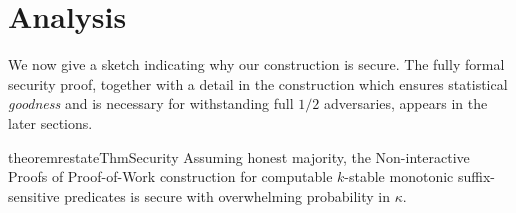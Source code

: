 \section{Analysis}
\label{sec:security}

We now give a sketch indicating why our construction is secure. The fully formal
security proof, together with a detail in the construction which ensures
statistical \emph{goodness} and is necessary for withstanding full $1/2$
adversaries, appears in the later sections.

\begin{restatable}[Security]{theorem}{restateThmSecurity}
    \label{thm.security}
    Assuming honest majority, the Non-interactive Proofs of Proof-of-Work
    construction for computable $k$-stable monotonic suffix-sensitive predicates
    is secure with overwhelming probability in $\kappa$.
\end{restatable}
